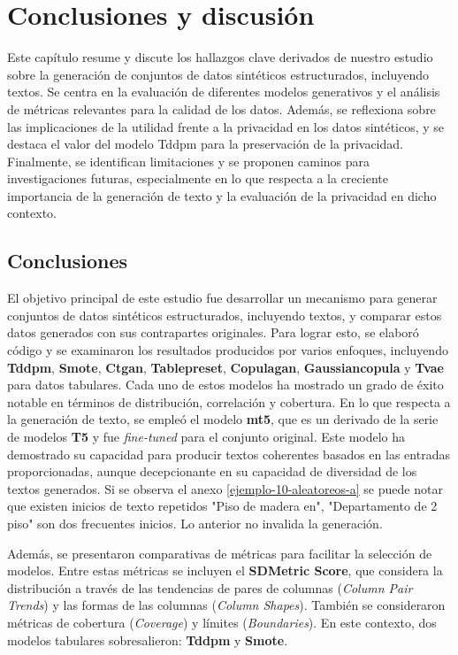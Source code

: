\chapter{Conclusiones y discusión}
Este capítulo resume y discute los hallazgos clave derivados de nuestro estudio sobre la generación de conjuntos de datos sintéticos estructurados, incluyendo textos. Se centra en la evaluación de diferentes modelos generativos y el análisis de métricas relevantes para la calidad de los datos. Además, se reflexiona sobre las implicaciones de la utilidad frente a la privacidad en los datos sintéticos, y se destaca el valor del modelo Tddpm para la preservación de la privacidad. Finalmente, se identifican limitaciones y se proponen caminos para investigaciones futuras, especialmente en lo que respecta a la creciente importancia de la generación de texto y la evaluación de la privacidad en dicho contexto.

\label{chap:conclusion}
\section{Conclusiones}
\label{sec:conclusion}
El objetivo principal de este estudio fue desarrollar un mecanismo para generar conjuntos de datos sintéticos estructurados, incluyendo textos, y comparar estos datos generados con sus contrapartes originales. Para lograr esto, se elaboró código y se examinaron los resultados producidos por varios enfoques, incluyendo \textbf{Tddpm}, \textbf{Smote}, \textbf{Ctgan}, \textbf{Tablepreset}, \textbf{Copulagan}, \textbf{Gaussiancopula} y \textbf{Tvae} para datos tabulares. Cada uno de estos modelos ha mostrado un grado de éxito notable en términos de distribución, correlación y cobertura. En lo que respecta a la generación de texto, se empleó el modelo \textbf{mt5}, que es un derivado de la serie de modelos \textbf{T5} y fue \emph{fine-tuned} para el conjunto original. Este modelo ha demostrado su capacidad para producir textos coherentes basados en las entradas proporcionadas, aunque decepcionante en su capacidad de diversidad de los textos generados. Si se observa el anexo \ref{ejemplo-10-aleatoreos-a} se puede notar que existen inicios de texto repetidos "Piso de madera en", "Departamento de 2 piso" son dos frecuentes inicios. Lo anterior no invalida la generación.


Además, se presentaron comparativas de métricas para facilitar la selección de modelos. Entre estas métricas se incluyen el \textbf{SDMetric Score}, que considera la distribución a través de las tendencias de pares de columnas (\emph{Column Pair Trends}) y las formas de las columnas (\emph{Column Shapes}). También se consideraron métricas de cobertura (\emph{Coverage}) y límites (\emph{Boundaries}). En este contexto, dos modelos tabulares sobresalieron: \textbf{Tddpm} y \textbf{Smote}.

